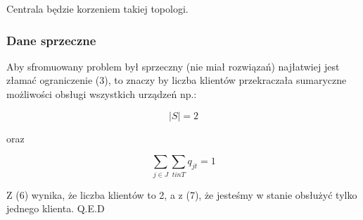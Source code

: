 \documentclass{article}
\begin{document}
Centrala będzie korzeniem takiej topologi.

\subsubsection{Dane sprzeczne}

Aby sfromuowany problem był sprzeczny (nie miał rozwiązań) najłatwiej jest złamać ograniczenie (3),
to znaczy by liczba klientów przekraczała sumaryczne możliwości obsługi wszystkich urządzeń np.:

\begin{equation}
  |S| = 2
\end{equation}

oraz

\begin{equation}
  \sum_{j \in J} \sum_{t in T} q_{jt} = 1
\end{equation}

Z (6) wynika, że liczba klientów to 2, a z (7), że jesteśmy w stanie obsłużyć tylko jednego klienta. Q.E.D
\end{document}
